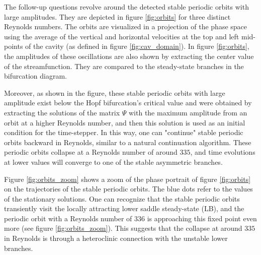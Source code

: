 The follow-up questions revolve around the detected stable periodic orbits with large
amplitudes. They are depicted in figure \ref{fig:orbits} for three distinct
Reynolds numbers. The orbits are visualized in a projection of the phase space
using the average of the vertical and horizontal velocities at the top and left
mid-points of the cavity (as defined in figure \ref{fig:cav_domain}). In figure
\ref{fig:orbits}, the amplitudes of these oscillations are also shown by
extracting the center value of the streamfunction. They are compared to the
steady-state branches in the bifurcation diagram. 

Moreover, as shown in the figure, these stable periodic orbits with large
amplitude exist below the Hopf bifurcation's critical value and were obtained
by extracting the solutions of the matrix $\Psi$ with the maximum amplitude
from an orbit at a higher Reynolds number, and then this solution is used as an
initial condition for the time-stepper. In this way, one can "continue" stable
periodic orbits backward in Reynolds, similar to a natural continuation
algorithm. These periodic orbits collapse at a Reynolds number of around $335$,
and time evolutions at lower values will converge to one of the stable
asymmetric branches.

Figure \ref{fig:orbits_zoom} shows a zoom of the phase portrait of figure
\ref{fig:orbits} on the trajectories of the stable periodic orbits. The blue
dots refer to the values of the stationary solutions. One can recognize that
the stable periodic orbits transiently visit the locally attracting lower
saddle steady-state (LB), and the periodic orbit with a Reynolds number of
$336$ is approaching this fixed point even more (see figure
\ref{fig:orbits_zoom}). This suggests that the collapse at around $335$ in
Reynolds is through a heteroclinic connection with the unstable lower branches.

